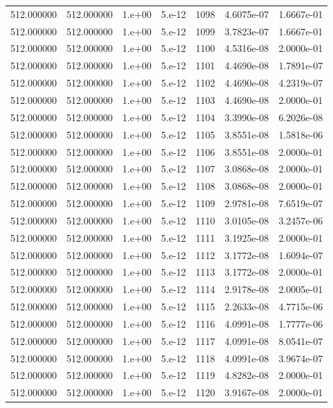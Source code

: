 \begin{table}[htbp]
\begin{tabular}{rrrrrrr}
512.000000 & 512.000000 & 1.e+00 & 5.e-12 & 1098 & 4.6075e-07 & 1.6667e-01 \\
512.000000 & 512.000000 & 1.e+00 & 5.e-12 & 1099 & 3.7823e-07 & 1.6667e-01 \\
512.000000 & 512.000000 & 1.e+00 & 5.e-12 & 1100 & 4.5316e-08 & 2.0000e-01 \\
512.000000 & 512.000000 & 1.e+00 & 5.e-12 & 1101 & 4.4690e-08 & 1.7891e-07 \\
512.000000 & 512.000000 & 1.e+00 & 5.e-12 & 1102 & 4.4690e-08 & 4.2319e-07 \\
512.000000 & 512.000000 & 1.e+00 & 5.e-12 & 1103 & 4.4690e-08 & 2.0000e-01 \\
512.000000 & 512.000000 & 1.e+00 & 5.e-12 & 1104 & 3.3990e-08 & 6.2026e-08 \\
512.000000 & 512.000000 & 1.e+00 & 5.e-12 & 1105 & 3.8551e-08 & 1.5818e-06 \\
512.000000 & 512.000000 & 1.e+00 & 5.e-12 & 1106 & 3.8551e-08 & 2.0000e-01 \\
512.000000 & 512.000000 & 1.e+00 & 5.e-12 & 1107 & 3.0868e-08 & 2.0000e-01 \\
512.000000 & 512.000000 & 1.e+00 & 5.e-12 & 1108 & 3.0868e-08 & 2.0000e-01 \\
512.000000 & 512.000000 & 1.e+00 & 5.e-12 & 1109 & 2.9781e-08 & 7.6519e-07 \\
512.000000 & 512.000000 & 1.e+00 & 5.e-12 & 1110 & 3.0105e-08 & 3.2457e-06 \\
512.000000 & 512.000000 & 1.e+00 & 5.e-12 & 1111 & 3.1925e-08 & 2.0000e-01 \\
512.000000 & 512.000000 & 1.e+00 & 5.e-12 & 1112 & 3.1772e-08 & 1.6094e-07 \\
512.000000 & 512.000000 & 1.e+00 & 5.e-12 & 1113 & 3.1772e-08 & 2.0000e-01 \\
512.000000 & 512.000000 & 1.e+00 & 5.e-12 & 1114 & 2.9178e-08 & 2.0005e-01 \\
512.000000 & 512.000000 & 1.e+00 & 5.e-12 & 1115 & 2.2633e-08 & 4.7715e-06 \\
512.000000 & 512.000000 & 1.e+00 & 5.e-12 & 1116 & 4.0991e-08 & 1.7777e-06 \\
512.000000 & 512.000000 & 1.e+00 & 5.e-12 & 1117 & 4.0991e-08 & 8.0541e-07 \\
512.000000 & 512.000000 & 1.e+00 & 5.e-12 & 1118 & 4.0991e-08 & 3.9674e-07 \\
512.000000 & 512.000000 & 1.e+00 & 5.e-12 & 1119 & 4.8282e-08 & 2.0000e-01 \\
512.000000 & 512.000000 & 1.e+00 & 5.e-12 & 1120 & 3.9167e-08 & 2.0000e-01 \\

\end{tabular}
\end{table}
